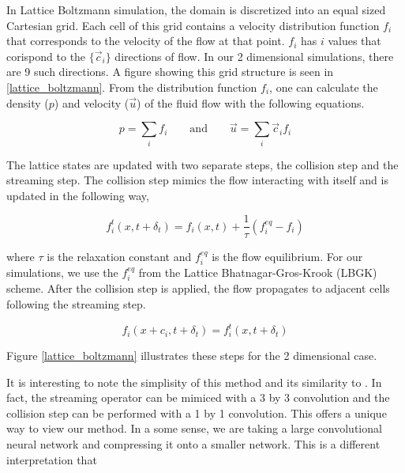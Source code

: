 \documentclass{article}
\begin{document}
In Lattice Boltzmann simulation, the domain is discretized into an equal sized Cartesian grid. Each cell of this grid contains a velocity distribution function $f_i$ that corresponds to the velocity of the flow at that point. $f_i$ has $i$ values that corispond to the $\{ \vec{c}_i \}$ directions of flow. In our 2 dimensional simulations, there are 9 such directions. A figure showing this grid structure is seen in \ref{lattice_boltzmann}. From the distribution function $f_i$, one can calculate the density ($p$) and velocity ($\vec{u}$) of the fluid flow with the following equations.

\begin{equation}
  p = \sum_i f_i  \qquad\text{and}\qquad \vec{u} = \sum_i \vec{c}_i f_i 
\end{equation}

The lattice states are updated with two separate steps, the collision step and the streaming step. The collision step mimics the flow interacting with itself and is updated in the following way,

\begin{equation}
  f^t_i(x, t + \delta_t) = f_i(x,t) + \frac{1}{\tau} (f_i^{eq} - f_i)
\end{equation}

where $\tau$ is the relaxation constant and $f_i^{eq}$ is the flow equilibrium. For our simulations, we use the $f_i^{eq}$ from the Lattice Bhatnagar-Gros-Krook (LBGK) scheme. After the collision step is applied, the flow propagates to adjacent cells following the streaming step. 

\begin{equation}
  f_i(x + c_i, t + \delta_t) = f^t_i(x,t + \delta_t)
\end{equation}

Figure \ref{lattice_boltzmann} illustrates these steps for the 2 dimensional case.

It is interesting to note the simplisity of this method and its similarity to . In fact, the streaming operator can be mimiced with a 3 by 3 convolution and the collision step can be performed with a 1 by 1 convolution. This offers a unique way to view our method. In a some sense, we are taking a large convolutional neural network and compressing it onto a smaller network. This is a different interpretation that

\end{document}
